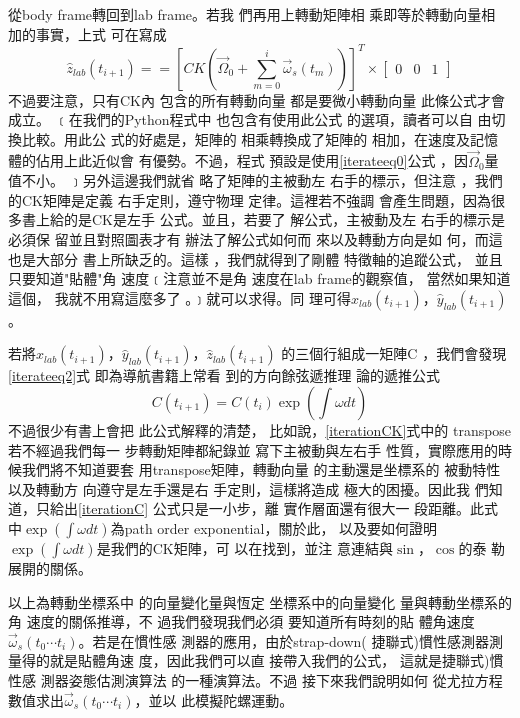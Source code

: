 \documentclass[12pt,twoside]{article}
\begin{document}
從body frame轉回到lab frame。若我%
們再用上轉動矩陣相%
乘即等於轉動向量相%
加的事實\cite{goldstein}，上式%
可在寫成%
\begin{equation}
\hat{z}_{lab}\left( t_{i+1}\right) ==\left[ CK\left( \vec{\Omega}%
_{0}+\sum\limits_{m=0}^{i}\vec{\omega}_{s}\left( t_{m}\right) \right) \right]
^{T}\times \left[ 
\begin{array}{ccc}
0 & 0 & 1%
\end{array}%
\right]  \label{iterateeq2}
\end{equation}%
不過要注意，只有CK內%
包含的所有轉動向量%
都是要微小轉動向量%
此條公式才會成立。%
﹝在我們的Python程式中%
也包含有使用此公式%
的選項，讀者可以自%
由切換比較。用此公%
式的好處是，矩陣的%
相乘轉換成了矩陣的%
相加，在速度及記憶%
體的佔用上此近似會%
有優勢。不過，程式%
預設是使用\ref{iterateeq0}公式%
，因$\vec{\Omega}_{0}$量值不小。%
﹞另外這邊我們就省%
略了矩陣的主被動左%
右手的標示，但注意%
，我們的CK矩陣是定義%
右手定則，遵守物理%
定律。這裡若不強調%
會產生問題，因為很%
多書上給的是CK是左手%
公式。並且，若要了%
解公式，主被動及左%
右手的標示是必須保%
留並且對照圖表才有%
辦法了解公式如何而%
來以及轉動方向是如%
何，而這也是大部分%
書上所缺乏的。這樣%
，我們就得到了剛體%
特徵軸的追蹤公式，%
並且只要知道"貼體"角%
速度﹝注意並不是角%
速度在lab frame的觀察值，%
當然如果知道這個，%
我就不用寫這麼多了%
。﹞就可以求得。同%
理可得$\hat{x}_{lab}\left( t_{i+1}\right) $，$\hat{y}%
_{lab}\left( t_{i+1}\right) $。

\bigskip 若將$\hat{x}_{lab}\left( t_{i+1}\right) $，$\hat{y%
}_{lab}\left( t_{i+1}\right) $，$\hat{z}_{lab}\left( t_{i+1}\right) $%
的三個行組成一矩陣C%
，我們會發現\ref{iterateeq2}式%
即為導航書籍上常看%
到的方向餘弦遞推理%
論的遞推公式\cite{titterton}%
\begin{equation}
C(t_{i+1})=C(t_{i})\exp (\int \omega dt)  \label{iterationC}
\end{equation}%
不過很少有書上會把%
此公式解釋的清楚，%
比如說，\ref{iterationCK}式中的%
transpose若不經過我們每一%
步轉動矩陣都紀錄並%
寫下主被動與左右手%
性質，實際應用的時%
候我們將不知道要套%
用transpose矩陣，轉動向量%
的主動還是坐標系的%
被動特性以及轉動方%
向遵守是左手還是右%
手定則，這樣將造成%
極大的困擾。因此我%
們知道，只給出\ref{iterationC}%
公式只是一小步，離%
實作層面還有很大一%
段距離。此式中$\exp (\int \omega
dt)$為path order exponential，關於此，%
以及要如何證明$\exp (\int \omega
dt)$是我們的CK矩陣，可%
以在\cite[Page 49]{tong}找到，並注%
意連結與$\sin $，$\cos $的泰%
勒展開的關係。

以上為轉動坐標系中%
的向量變化量與恆定%
坐標系中的向量變化%
量與轉動坐標系的角%
速度的關係推導，不%
過我們發現我們必須%
要知道所有時刻的貼%
體角速度$\vec{\omega}_{s}\left( t_{0}\cdots
t_{i}\right) $。若是在慣性感%
測器的應用，由於strap-down(%
捷聯式)慣性感測器測%
量得的就是貼體角速%
度，因此我們可以直%
接帶入我們的公式，%
這就是捷聯式)慣性感%
測器姿態估測演算法%
的一種演算法。不過%
接下來我們說明如何%
從尤拉方程數值求出$%
\vec{\omega}_{s}\left( t_{0}\cdots t_{i}\right) $，並以%
此模擬陀螺運動。
\end{document}
